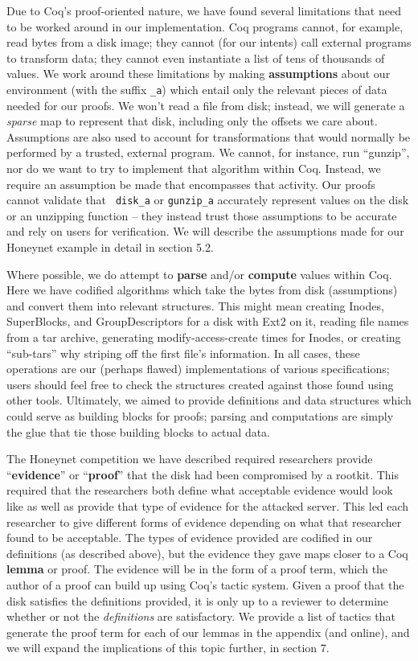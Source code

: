 \documentclass[nocopyrightspace]{sigplanconf}
\begin{document}
Due to Coq's proof-oriented nature, we have found several limitations that
need to be worked around in our implementation. Coq programs cannot, for
example, read bytes from a disk image; they cannot (for our intents) call
external programs to transform data; they cannot even instantiate a list of
tens of thousands of values. We work around these limitations by making {\bf
assumptions} about our environment (with the suffix {\tt \_a}) which entail
only the relevant pieces of data needed for our proofs. We won't read a file
from disk; instead, we will generate a {\it sparse} map to represent that
disk, including only the offsets we care about.  Assumptions are also used to
account for transformations that would normally be performed by a trusted,
external program. We cannot, for instance, run ``gunzip'', nor do we want to
try to implement that algorithm within Coq.  Instead, we require an assumption
be made that encompasses that activity. Our proofs cannot validate that {\tt
disk\_a} or {\tt gunzip\_a} accurately represent values on the disk or an
unzipping function -- they instead trust those assumptions to be accurate and
rely on users for verification. We will describe the assumptions made for our
Honeynet example in detail in section 5.2.

Where possible, we do attempt to {\bf parse} and/or {\bf compute} values
within Coq. Here we have codified algorithms which take the bytes from disk
(assumptions) and convert them into relevant structures. This might mean
creating Inodes, SuperBlocks, and GroupDescriptors for a disk with Ext2 on it,
reading file names from a tar archive, generating modify-access-create times
for Inodes, or creating ``sub-tars'' why striping off the first file's
information. In all cases, these operations are our (perhaps flawed)
implementations of various specifications; users should feel free to check the
structures created against those found using other tools. Ultimately, we aimed
to provide definitions and data structures which could serve as building
blocks for proofs; parsing and computations are simply the glue that tie those
building blocks to actual data.

The Honeynet competition we have described required researchers provide
``{\bf evidence}'' or ``{\bf proof}'' that the disk had been compromised by a
rootkit. This required that the researchers both define what acceptable
evidence would look like as well as provide that type of evidence for the
attacked server. This led each researcher to give different forms of evidence
depending on what that researcher found to be acceptable. The types of
evidence provided are codified in our definitions (as described above), but
the evidence they gave maps closer to a Coq {\bf lemma} or proof. The evidence
will be in the form of a proof term, which the author of a proof can build up
using Coq's tactic system. Given a proof that the disk satisfies the
definitions provided, it is only up to a reviewer to determine whether or not
the {\em definitions} are satisfactory. We provide a list of tactics that
generate the proof term for each of our lemmas in the appendix (and online),
and we will expand the implications of this topic further, in section 7.
\end{document}
